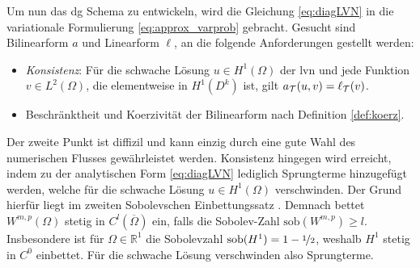 Um nun das \ac{dg} Schema zu entwickeln, wird die Gleichung \eqref{eq:diagLVN} in die variationale Formulierung \eqref{eq:approx_varprob} gebracht. Gesucht sind Bilinearform $a$ und Linearform $\ell$, an die folgende Anforderungen gestellt werden:
\begin{itemize}
  \item \emph{Konsistenz}: Für die schwache Lösung $u\in H^1(\Omega)$ der \ac{lvn} und jede Funktion $v\in L^2(\Omega)$, die elementweise in $H^1(D^k)$ ist, gilt ${a_{\mathcal{T}}(u,v)=\ell_{\mathcal{T}}(v)}$.
  \item Beschränktheit und Koerzivität der Bilinearform nach Definition \ref{def:koerz}.
\end{itemize}
Der zweite Punkt ist diffizil und kann einzig durch eine gute Wahl des numerischen Flusses gewährleistet werden.
Konsistenz hingegen wird erreicht, indem zu der analytischen Form \eqref{eq:diagLVN} lediglich Sprungterme hinzugefügt werden, welche für die schwache Lösung $u\in H^1(\Omega)$ verschwinden. Der Grund hierfür liegt im zweiten Sobolevschen Einbettungssatz \cite{buchPietro}. Demnach bettet $W^{m,p}(\Omega)$ stetig in $C^{l}(\overline{\Omega})$ ein, falls die Sobolev-Zahl ${\text{sob}(W^{m,p})\geq l}$.
Insbesondere ist für $\Omega\in\mathbb{R}^1$ die Sobolevzahl $\text{sob}(H^1) = 1-\nicefrac{1}{2}$, weshalb $H^1$ stetig in $C^0$ einbettet. Für die schwache Lösung verschwinden also Sprungterme.


